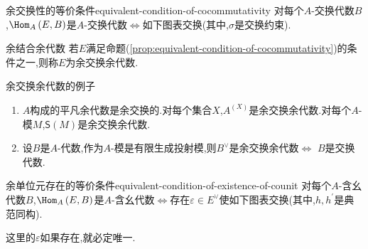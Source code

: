 \begin{proposition}{余交换性的等价条件}{equivalent-condition-of-cocommutativity}
	对每个$A$-交换代数$B$,$\Hom_{A}\left(E,B\right)$是$A$-交换代数$\iff$如下图表交换(其中,$\sigma$是交换约束).
	\begin{center}
	\end{center}
\end{proposition}

\begin{definition}{余结合余代数}{}
	若$E$满足命题(\cref{prop:equivalent-condition-of-cocommutativity})的条件之一,则称$E$为余交换余代数.
\end{definition}

\begin{example}{余交换余代数的例子}{}
	\begin{enumerate}
		\item $A$构成的平凡余代数是余交换的.对每个集合$X$,$A^{\left(X\right)}$是余交换余代数.对每个$A$-模$M$,$\mathsf{S}\left(M\right)$是余交换余代数.
		\item 设$B$是$A$-代数,作为$A$-模是有限生成投射模,则$B^{\vee}$是余交换余代数$\iff$ $B$是交换代数.
	\end{enumerate}
\end{example}

\begin{proposition}{余单位元存在的等价条件}{equivalent-condition-of-existence-of-counit}
	对每个$A$-含幺代数$B$,$\Hom_{A}\left(E,B\right)$是$A$-含幺代数$\iff$存在$\varepsilon\in E^{\vee}$使如下图表交换(其中,$h,h^{\prime}$是典范同构).
	\begin{center}
	\end{center}
\end{proposition}

\begin{remark}{}{}
	这里的$\varepsilon$如果存在,就必定唯一.
\end{remark}

